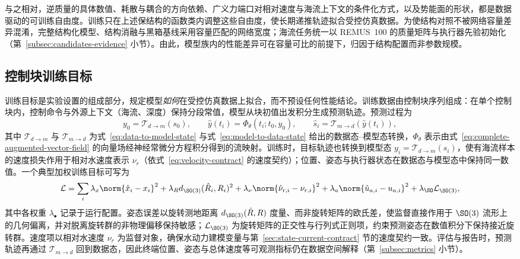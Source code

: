与之相对，逆质量的具体数值、耗散与耦合的方向依赖、广义力端口对相对速度与海流上下文的条件化方式，以及势能面的形状，都是数据驱动的可训练自由度。训练只在上述保结构的函数类内调整这些自由度，使长期递推轨迹拟合受控仿真数据。为使结构对照不被网络容量差异混淆，完整结构化模型、结构消融与黑箱基线采用容量匹配的网络宽度；海流任务统一以 REMUS~100 的质量矩阵与执行器先验初始化（第~\ref{subsec:candidates-evidence} 小节）。由此，模型族内的性能差异可在容量可比的前提下，归因于结构配置而非参数规模。

\subsection{控制块训练目标}
\label{subsec:training-objective}

训练目标是实验设置的组成部分，规定模型\emph{如何}在受控仿真数据上拟合，而不预设任何性能结论。训练数据由控制块序列组成：在单个控制块内，控制命令与外源上下文（海流、深度）保持分段常值，模型从块初值出发积分生成预测轨迹。预测过程为
\begin{equation}
  y_0=\mathcal{T}_{d\to m}(s_0),\qquad
  \hat y(t_i)=\Phi_\theta(t_i;t_0,y_0),\qquad
  \hat s_i=\mathcal{T}_{m\to d}(\hat y(t_i)),
  \label{eq:block-prediction}
\end{equation}
其中 \(\mathcal{T}_{d\to m}\) 与 \(\mathcal{T}_{m\to d}\) 为式~\eqref{eq:data-to-model-state} 与式~\eqref{eq:model-to-data-state} 给出的数据态--模型态转换，\(\Phi_\theta\) 表示由式~\eqref{eq:complete-augmented-vector-field} 的向量场经神经常微分方程积分得到的流映射。训练时，目标轨迹也转换到模型态 \(y_i=\mathcal{T}_{d\to m}(s_i)\)，使有海流样本的速度损失作用于相对水速度表示 \(\nu_r\)（依式~\eqref{eq:velocity-contract} 的速度契约）；位置、姿态与执行器状态在数据态与模型态中保持同一数值。一个典型加权训练目标可写为
\begin{equation}
  \mathcal{L}
  =
  \sum_i
  \lambda_x\norm{\hat x_i-x_i}^2
  +\lambda_R d_{\SO(3)}(\hat R_i,R_i)^2
  +\lambda_\nu\norm{\hat\nu_{r,i}-\nu_{r,i}}^2
  +\lambda_a\norm{\hat u_{a,i}-u_{a,i}}^2
  +\lambda_{\SO}\mathcal{L}_{\SO(3)} ,
  \label{eq:training-loss}
\end{equation}
其中各权重 \(\lambda_\bullet\) 记录于运行配置。姿态误差以旋转测地距离 \(d_{\SO(3)}(\hat R,R)\) 度量、而非旋转矩阵的欧氏差，使监督直接作用于 \(\SO(3)\) 流形上的几何偏离，并对脱离旋转群的非物理偏移保持敏感；\(\mathcal{L}_{\SO(3)}\) 为旋转矩阵的正交性与行列式正则项，约束预测姿态在数值积分下保持接近旋转群。速度项以相对水速度 \(\nu_r\) 为监督对象，确保水动力建模变量与第~\ref{sec:state-current-contract} 节的速度契约一致。评估与报告时，预测轨迹再通过 \(\mathcal{T}_{m\to d}\) 回到数据态，因此终端位置、姿态与总体速度等可观测指标仍在数据空间解释（第~\ref{subsec:metrics} 小节）。

